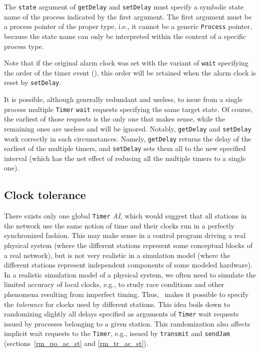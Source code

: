 The {\tt state} argument of {\tt getDelay} and {\tt setDelay} must
specify a symbolic state name of the process indicated by the first
argument.
The first argument must be a process pointer of the proper type, i.e.,
it cannot be a generic {\tt Process} pointer, because the state name
can only be interpreted within the context of a specific process type.

Note that if the original alarm clock was set with the variant of {\tt wait}
specifying the order of the timer event (), this order will
be retained when the alarm clock is reset by {\tt setDelay}.

It is possible, although generally redundant and useless,
to issue from a single process multiple {\tt Timer} {\tt wait}
requests specifying the same target state.
Of course, the earliest of those requests is the only one that makes
sense, while the remaining ones are useless and will be ignored.
Notably, {\tt getDelay} and {\tt setDelay} work correctly in such
circumstances.
Namely, {\tt getDelay} returns the delay of the earliest of the multiple
timers, and {\tt setDelay} sets them all to the new specified interval (which
has the net effect of reducing all the multiple timers to a single one).

\subsection{Clock tolerance}
\label{rm_ti_to}

There exists only one global {\tt Timer} {\em AI}, which would suggest that all
stations in the network use the same notion of time and their clocks run
in a perfectly synchronized fashion.
This may make sense in a control program driving a real physical system
(where the different stations represent some conceptual blocks of a real
network),
but is not very realistic in a simulation model (where the different stations
represent independent components of some modeled hardware).
In a realistic simulation model of a physical system, we often need to
simulate the limited accuracy of local clocks, e.g., to study race
conditions and other phenomena resulting from imperfect timing.
Thus, \smurph\ makes it possible to specify the {\em tolerance\/} for clocks
used by different stations.
This idea boils down to randomizing slightly all delays specified as
arguments of {\tt Timer} wait requests issued by processes belonging to a
given station.
This randomization also affects implicit wait requests to the {\tt Timer},
e.g., issued by {\tt transmit} and {\tt sendJam}
(sections~\ref{rm_po_ac_st} and \ref{rm_tr_ac_st}).

